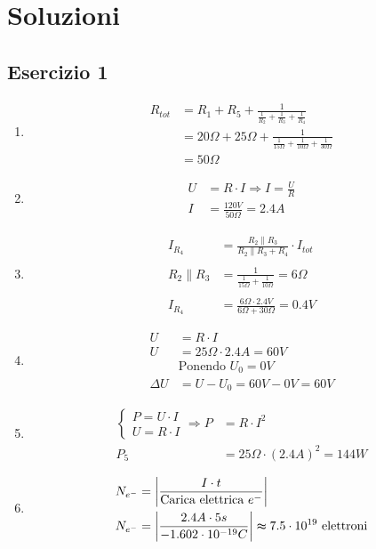 \documentclass{article}
\begin{document}
\pagebreak

\section*{Soluzioni}
\subsection*{Esercizio 1}
\vspace*{1cm}
\begin{enumerate}[label=\textbf{1\alph*)}]
    \item \begin{align*}
        R_{tot} & = R_1 + R_5 + \frac{1}{\frac{1}{R_2}+\frac{1}{R_3}+\frac{1}{R_4}} \\
        & = 20 \Omega + 25 \Omega + 
        \frac{1}{\frac{1}{15\Omega} +\frac{1}{10\Omega} +\frac{1}{30\Omega}} \\
        & = 50 \Omega
    \end{align*}
    \item \begin{align*}
        U & = R \cdot I \Rightarrow I = \frac{U}{R} \\
        I & = \frac{120V}{50\Omega} = 2.4 A
    \end{align*}
    \item \begin{align*}
        I_{R_4} & = \frac{R_2 \parallel R_3}{R_2 \parallel R_3 + R_4} \cdot I_{tot} \\
        \\
        R_2 \parallel R_3 & = \frac{1}{\frac{1}{15\Omega}+\frac{1}{10\Omega}}
        = 6\Omega \\
        \\
        I_{R_4} & = 
        \frac{6\Omega \cdot 2.4 V}{6\Omega + 30\Omega} = 0.4V
    \end{align*}
    \item \begin{align*}
        U &= R \cdot I \\
        U &= 25\Omega \cdot 2.4 A = 60V \\
        &\text{Ponendo } U_0 = 0V \\
        \Delta{U} &= U - U_0 = 60V - 0V = 60V
    \end{align*}
    \item \begin{align*}
        \begin{cases}
            P = U \cdot I \\
            U = R \cdot I 
        \end{cases} \Rightarrow P &= R \cdot I^2 \\
        P_5 &= 25\Omega \cdot (2.4A)^2 = 144 W
    \end{align*}
    \item \begin{align*}
        N_{e^-} &= \left\lvert\frac{I \cdot t}{\text{Carica elettrica }e^-}\right\rvert \\
        N_{e^-} &= \left\lvert\frac{2.4A \cdot 5s}{-1.602 \cdot 10^{-19} C}\right\rvert
        \thickapprox 7.5 \cdot 10^{19} \text{ elettroni}
    \end{align*}
\end{enumerate}
\end{document}
